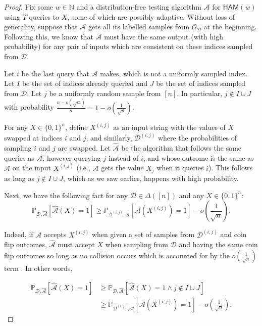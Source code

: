 \documentclass[11pt]{article}
\newcommand{\HAM}{\mathsf{HAM}}
\newcommand{\N}{\mathbb{N}}
\newcommand{\sD}{\mathcal{D}}
\newcommand{\sO}{\mathcal{O}}
\newcommand{\sA}{\mathcal{A}}
\begin{document}
\begin{proof}
Fix some $w \in \N$ and a distribution-free testing algorithm $\mathcal{A}$ for $\HAM(w)$ using $T$ queries to $X$, some of which are possibly adaptive. Without loss of generality, suppose that $\sA$ gets all its labelled samples from $\sO_\sD$ at the beginning. Following this, we know that $\sA$ must have the same output (with high probability) for any pair of inputs which are consistent on these indices sampled from $\sD$. 

Let $i$ be the last query that $\sA$ makes, which is not a uniformly sampled index. Let $I$ be the set of indices already queried and $J$ be the set of indices sampled from $\mathcal{D}$. Let $j$ be a uniformly random sample from $[n]$. In particular, $j \notin I \cup J$ with probability $\frac{n-o(\sqrt{n})}{n}=1-o(\frac{1}{\sqrt{n}})$.

For any $X\in\{0,1\}^{n}$, define $X^{(i,j)}$ as an input string with the values of $X$ swapped at indices $i$ and $j$, and similarly, $\mathcal{D}^{(i,j)}$ where the probabilities of sampling $i$ and $j$ are swapped. Let $\hat{\sA}$ be the algorithm that follows the same queries as $\mathcal{A}$, however querying $j$ instead of $i$, and whose outcome is the same as $\mathcal{A}$ on the input $X^{(i,j)}$ (i.e., $\sA$ gets the value $X_j$ when it queries $i$). This follows as long as $j\not\in I\cup J$, which as we saw earlier, happens with high probability.

Next, we have the following fact for any $\mathcal{D}\in \Delta([n])$ and any $X \in\{0,1\}^{n}$: 
\begin{equation}
\label{eq:ij_swap}
    \mathbb{P}_{\mathcal{D}, \hat{\mathcal{A}}}\left[\mathcal{\hat{\sA}}(X)=1\right]\geq\mathbb{P}_{\mathcal{D}^{(i,j)},\mathcal{A}}\left[\mathcal{A}(X^{(i,j)})=1\right]-o\left(\frac{1}{\sqrt{n}}\right).
\end{equation}

Indeed, if $\mathcal{A}$ accepts $X^{(i,j)}$ when given a set of samples from $\sD^{(i,j)}$ and coin flip outcomes, $\hat{\mathcal{A}}$ must accept $X$ when sampling from $\sD$ and having the same coin flip outcomes so long as no collision occurs which is accounted for by the $o \left( \frac{1}{\sqrt{n}} \right)$ term . In other words,

\[
\begin{split}
    \mathbb{P}_{\mathcal{D}, \hat{\mathcal{A}}}\left[\mathcal{\hat{\sA}}(X)=1\right] &\geq \mathbb{P}_{\mathcal{D}, \hat{\mathcal{A}}}\left[\mathcal{\hat{\sA}}(X)=1 \wedge j\not\in I\cup J\right]\\
    &\geq\mathbb{P}_{\mathcal{D}^{(i,j)},\mathcal{A}}\left[\mathcal{A}(X^{(i,j)})=1\right]-o\left(\frac{1}{\sqrt{n}}\right).
\end{split}
\]


\end{proof}
\end{document}
